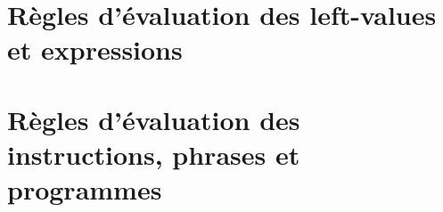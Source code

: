 \section*{Règles d'évaluation des left-values et expressions }

\begin{framed}

\begin{mathpar}


















\end{mathpar}

\end{framed}

\newpage
\section*{Règles d'évaluation des instructions, phrases et programmes}

